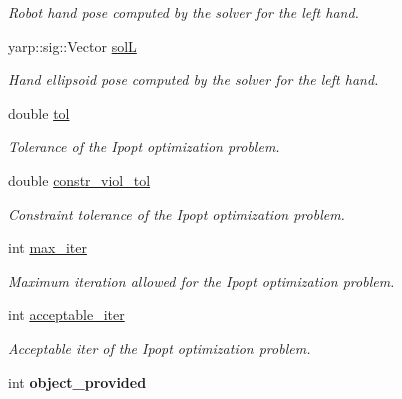 \begin{DoxyCompactItemize}
\begin{DoxyCompactList}\small\item\em Robot hand pose computed by the solver for the left hand. \end{DoxyCompactList}\item 
yarp\+::sig\+::\+Vector \hyperlink{classGraspComputation_a0b1a5422bfc7eb04976a8cf4f3a63ed4}{solL}\label{classGraspComputation_a0b1a5422bfc7eb04976a8cf4f3a63ed4}

\begin{DoxyCompactList}\small\item\em Hand ellipsoid pose computed by the solver for the left hand. \end{DoxyCompactList}\item 
double \hyperlink{classGraspComputation_abeab81e105369cb96aa81154dd6deced}{tol}\label{classGraspComputation_abeab81e105369cb96aa81154dd6deced}

\begin{DoxyCompactList}\small\item\em Tolerance of the Ipopt optimization problem. \end{DoxyCompactList}\item 
double \hyperlink{classGraspComputation_a19511014ec2f0e0e91a4d63dc666955b}{constr\+\_\+viol\+\_\+tol}\label{classGraspComputation_a19511014ec2f0e0e91a4d63dc666955b}

\begin{DoxyCompactList}\small\item\em Constraint tolerance of the Ipopt optimization problem. \end{DoxyCompactList}\item 
int \hyperlink{classGraspComputation_ab41a54f337bcd46ecdee9b40a0c964c8}{max\+\_\+iter}\label{classGraspComputation_ab41a54f337bcd46ecdee9b40a0c964c8}

\begin{DoxyCompactList}\small\item\em Maximum iteration allowed for the Ipopt optimization problem. \end{DoxyCompactList}\item 
int \hyperlink{classGraspComputation_a1c8f00915603a90bd1bb405ea9d49ebd}{acceptable\+\_\+iter}\label{classGraspComputation_a1c8f00915603a90bd1bb405ea9d49ebd}

\begin{DoxyCompactList}\small\item\em Acceptable iter of the Ipopt optimization problem. \end{DoxyCompactList}\item 
int {\bfseries object\+\_\+provided}\label{classGraspComputation_adf5c4faf99e9e11cdaf8965fb7da91c4}


\end{DoxyCompactItemize}
